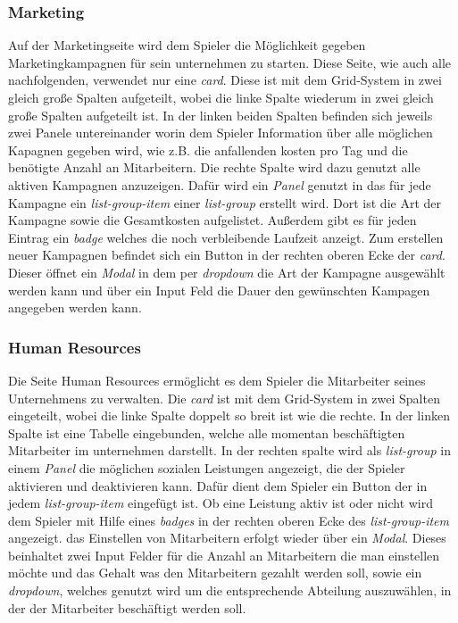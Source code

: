  \subsubsection{Marketing}
 Auf der Marketingseite wird dem Spieler die Möglichkeit gegeben Marketingkampagnen für sein unternehmen zu starten. Diese Seite, wie auch alle nachfolgenden, verwendet nur eine \textit{card}. Diese ist mit dem Grid-System in zwei gleich große Spalten aufgeteilt, wobei die linke Spalte wiederum in zwei gleich große Spalten aufgeteilt ist. In der linken beiden Spalten befinden sich jeweils zwei Panele untereinander worin dem Spieler Information über alle möglichen Kapagnen gegeben wird, wie z.B. die anfallenden kosten pro Tag und die benötigte Anzahl an Mitarbeitern. Die rechte Spalte wird dazu genutzt alle aktiven Kampagnen anzuzeigen. Dafür wird ein \textit{Panel} genutzt in das für jede Kampagne ein \textit{list-group-item} einer \textit{list-group} erstellt wird. Dort ist die Art der Kampagne sowie die Gesamtkosten aufgelistet. Außerdem gibt es für jeden Eintrag ein \textit{badge} welches die noch verbleibende Laufzeit anzeigt. Zum erstellen neuer Kampagnen befindet sich ein Button in der rechten oberen Ecke der \textit{card}. Dieser öffnet ein \textit{Modal} in dem per \textit{dropdown} die Art der Kampagne ausgewählt werden kann und über ein Input Feld die Dauer den gewünschten Kampagen angegeben werden kann.

 \subsubsection{Human Resources}
 Die Seite Human Resources ermöglicht es dem Spieler die Mitarbeiter seines Unternehmens zu verwalten. Die \textit{card} ist mit dem Grid-System in zwei Spalten eingeteilt, wobei die linke Spalte doppelt so breit ist wie die rechte. In der linken Spalte ist eine Tabelle eingebunden, welche alle momentan beschäftigten Mitarbeiter im unternehmen darstellt. In der rechten spalte wird als \textit{list-group} in einem \textit{Panel} die möglichen sozialen Leistungen angezeigt, die der Spieler aktivieren und deaktivieren kann. Dafür dient dem Spieler ein Button der in jedem \textit{list-group-item} eingefügt ist. Ob eine Leistung aktiv ist oder nicht wird dem Spieler mit Hilfe eines \textit{badges} in der rechten oberen Ecke des \textit{list-group-item} angezeigt. das Einstellen von Mitarbeitern erfolgt wieder über ein \textit{Modal}. Dieses beinhaltet zwei Input Felder für die Anzahl an Mitarbeitern die man einstellen möchte und das Gehalt was den Mitarbeitern gezahlt werden soll, sowie ein \textit{dropdown}, welches genutzt wird um die entsprechende Abteilung auszuwählen, in der der Mitarbeiter beschäftigt werden soll.

